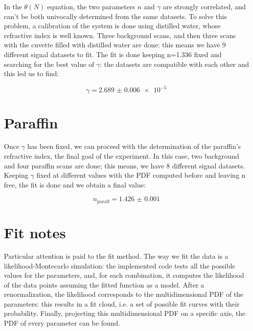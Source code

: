 \documentclass[a4paper, 12pt]{article}
\begin{document}
In the \(\theta(N)\)  equation, the two parameters \(n\) and \(\gamma\) are strongly correlated, and can’t be both univocally determined from the same datasets. To solve this problem, a calibration of the system is done using distilled water, whose refractive index is well known. Three background scans, and then three scans with the cuvette filled with distilled water are done: this means we have 9 different signal datasets to fit. The fit is done keeping n=1.336 fixed and searching for the best value of \(\gamma\): the datasets are compatible with each other and this led us to find:

\begin{equation}
  \gamma = \SI{2.689(6)e-5}{}
\end{equation}

\section{Paraffin}

Once \(\gamma\) has been fixed, we can proceed with the determination of the paraffin’s refractive index, the final goal of the experiment. In this case, two background and four paraffin scans are done; this means, we have 8 different signal datasets. Keeping \(\gamma\) fixed at different values with the PDF computed before and leaving n free, the fit is done and we obtain a final value:

\begin{equation}
  n_{\text{paraff}} = \SI{1.426(1)}{}
\end{equation}

\section{Fit notes}

Particular attention is paid to the fit method. The way we fit the data is a likelihood-Montecarlo simulation: the implemented code tests all the possible values for the parameters, and, for each combination, it computes the likelihood of the data points assuming the fitted function as a model. After a renormalization, the likelihood corresponds to the multidimensional PDF of the parameters: this results in a fit cloud, i.e. a set of possible fit curves with their probability. Finally, projecting this multidimensional PDF on a specific axis, the PDF of every parameter can be found.
\end{document}
